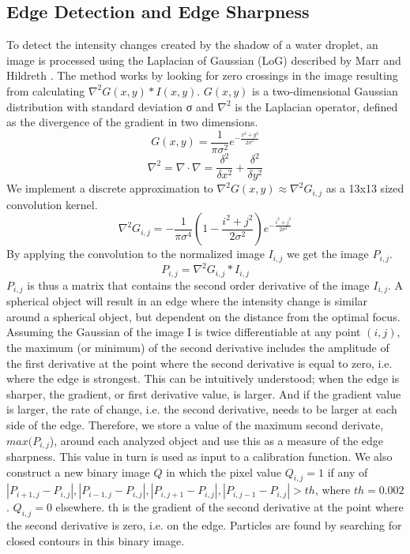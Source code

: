 \subsection{Edge Detection and Edge Sharpness}

To detect the intensity changes created by the shadow of a water droplet, an image is processed using the Laplacian of Gaussian (LoG) described by Marr and Hildreth \cite{marr1980}. The method works by looking for zero crossings in the image resulting from calculating $\nabla^2 G\left(x,y\right) * I\left(x,y\right)$. $G\left(x,y\right)$ is a two-dimensional Gaussian distribution with standard deviation σ and $\nabla^2$ is the Laplacian operator, defined as the divergence of the gradient in two dimensions.
\begin{equation}
G\left(x,y\right) = \frac{1}{\pi \sigma^2} e^{-\frac{x^2+y^2}{2\sigma^2}}
\end{equation}
\begin{equation}
\nabla^2=\nabla\cdot\nabla=\frac{\delta^2}{\delta x^2} + \frac{\delta^2}{\delta y^2}
\end{equation}
We implement a discrete approximation to $\nabla^2 G\left(x,y\right) \approx \nabla^2 G_{i,j}$ as a 13x13 sized convolution kernel.
\begin{equation}
\nabla^2 G_{i,j} = -\frac{1}{\pi \sigma^4} \left(1 - \frac{i^2+j^2}{2\sigma^2} \right) e^{-\frac{i^2+j^2}{2\sigma^2}}
\end{equation}
By applying the convolution to the normalized image $I_{i,j}$ we get the image $P_{i,j}$.
\begin{equation}
P_{i,j}=\nabla^2 G_{i,j} * I_{i,j}
\end{equation}
$P_{i,j}$ is thus a matrix that contains the second order derivative of the image $I_{i,j}$. 
A spherical object will result in an edge where the intensity change is similar around a spherical object, but dependent on the distance from the optimal focus. Assuming the Gaussian of the image I is twice differentiable at any point $(i,j)$, the maximum (or minimum) of the second derivative includes the amplitude of the first derivative at the point where the second derivative is equal to zero, i.e. where the edge is strongest. This can be intuitively understood; when the edge is sharper, the gradient, or first derivative value, is larger. And if the gradient value is larger, the rate of change, i.e. the second derivative, needs to be larger at each side of the edge. Therefore, we store a value of the maximum second derivate, $max(P_{i,j}$), around each analyzed object and use this as a measure of the edge sharpness. This value in turn is used as input to a calibration function. 
We also construct a new binary image $Q$ in which the pixel value $Q_{i,j}=1$ if any of $|P_{i+1,j}-P_{i,j} |,|P_{i-1,j}-P_{i,j} |,|P_{i,j+1}-P_{i,j} |,|P_{i,j-1}-P_{i,j} |>th$, where $th=0.002$. $Q_{i,j}=0$ elsewhere. th is the gradient of the second derivative at the point where the second derivative is zero, i.e. on the edge. Particles are found by searching for closed contours in this binary image.

